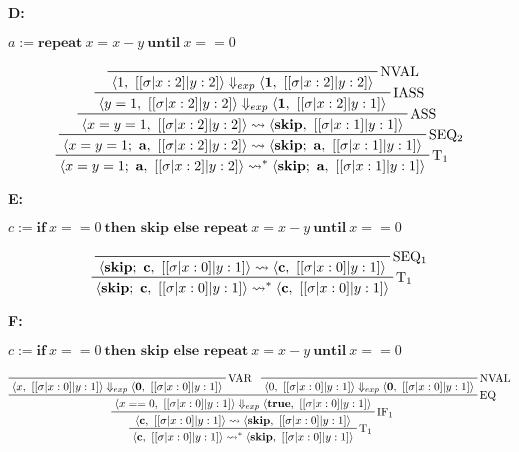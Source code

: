 \documentclass[11pt]{article}
\newcommand{\curly}{\mathrel{\leadsto}}
\begin{document}
\textbf{D:}

$a:= \textbf{repeat}\ x=x-y\ \textbf{until}\ x==0$

\begin{displaymath}
    \prftree[r]{$\mathrm{T_1}$}{
        \prftree[r]{$\mathrm{SEQ_2}$}{
            \prftree[r]{$\mathrm{ASS}$}{
                \prftree[r]{$\mathrm{IASS}$}{
                    \prftree[r]{$\mathrm{NVAL}$}
                    {\langle 1,\ [[\sigma|x:2]|y:2] \rangle \Downarrow_{exp} \langle \textbf{1} ,\ [[\sigma|x:2]|y:2] \rangle}
                }
                {\langle y=1,\ [[\sigma|x:2]|y:2] \rangle \Downarrow_{exp} \langle \textbf{1} ,\ [[\sigma|x:2]|y:1] \rangle}
            }
            {\langle x=y=1,\ [[\sigma|x:2]|y:2] \rangle \curly \langle \textbf{skip} ,\ [[\sigma|x:1]|y:1] \rangle}
        }
        {\langle x=y=1;\ \textbf{a},\ [[\sigma|x:2]|y:2] \rangle \curly \langle \textbf{skip};\ \textbf{a},\ [[\sigma|x:1]|y:1] \rangle}
    }
    {\langle x=y=1;\ \textbf{a},\ [[\sigma|x:2]|y:2] \rangle \curly^* \langle \textbf{skip};\ \textbf{a},\ [[\sigma|x:1]|y:1] \rangle}
\end{displaymath}

\textbf{E:}

$c:= \textbf{if}\ x==0\ \textbf{then\ skip\ else\ repeat}\ x=x-y\ \textbf{until}\ x==0$

\begin{displaymath}
    \prftree[r]{$\mathrm{T_1}$}{
        \prftree[r]{$\mathrm{SEQ_1}$}
        {\langle \textbf{skip}; \ \textbf{c},\ [[\sigma|x:0]|y:1] \rangle \curly \langle \textbf{c},\ [[\sigma|x:0]|y:1] \rangle}
    }
    {\langle \textbf{skip}; \ \textbf{c},\ [[\sigma|x:0]|y:1] \rangle \curly^* \langle \textbf{c},\ [[\sigma|x:0]|y:1] \rangle}
\end{displaymath}

\textbf{F:}

$c:= \textbf{if}\ x==0\ \textbf{then\ skip\ else\ repeat}\ x=x-y\ \textbf{until}\ x==0$

\begin{displaymath}
    \prftree[r]{$\mathrm{T_1}$}{
        \prftree[r]{$\mathrm{IF_1}$}{
            \prftree[r]{$\mathrm{EQ}$}{
                \prftree[r]{$\mathrm{VAR}$}
                {\langle x,\ [[\sigma|x:0]|y:1] \rangle \Downarrow_{exp} \langle \textbf{0},\ [[\sigma|x:0]|y:1] \rangle}
            }{
                \prftree[r]{$\mathrm{NVAL}$}
                {\langle 0,\ [[\sigma|x:0]|y:1] \rangle \Downarrow_{exp} \langle \textbf{0},\ [[\sigma|x:0]|y:1] \rangle}
            }
            {\langle x==0,\ [[\sigma|x:0]|y:1] \rangle \Downarrow_{exp} \langle \textbf{true},\ [[\sigma|x:0]|y:1] \rangle}
        }
        {\langle \textbf{c},\ [[\sigma|x:0]|y:1] \rangle \curly \langle \textbf{skip},\ [[\sigma|x:0]|y:1] \rangle}
    }
    {\langle \textbf{c},\ [[\sigma|x:0]|y:1] \rangle \curly^* \langle \textbf{skip},\ [[\sigma|x:0]|y:1] \rangle}
\end{displaymath}
\end{document}
